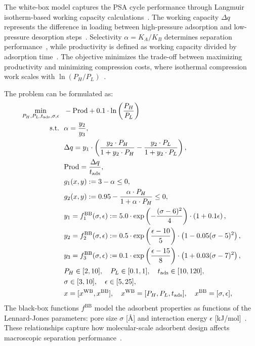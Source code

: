 \documentclass[12pt,a4paper]{article}%
\theoremstyle{plain}%
\theoremstyle{remark}%
\theoremstyle{definition}%
\def\WB{\mathrm{WB}}
\def\BB{\mathrm{BB}}
\begin{document}
\begin{appendices}
The white-box model captures the PSA cycle performance through Langmuir isotherm-based working capacity calculations~\cite{langmuir1918adsorption,wang2023adsorption}. The working capacity $\Delta q$ represents the difference in loading between high-pressure adsorption and low-pressure desorption steps~\cite{yang1987gas,ruthven1994psa}. Selectivity $\alpha = K_A/K_B$ determines separation performance~\cite{hasan2013cost}, while productivity is defined as working capacity divided by adsorption time~\cite{leperi2019surrogate}. The objective minimizes the trade-off between maximizing productivity and minimizing compression costs, where isothermal compression work scales with $\ln(P_H/P_L)$~\cite{smith2018thermodynamics}.

The problem can be formulated as:
\begin{align} \label{eq:PSA}
    \min_{P_H, P_L, t_{\text{ads}}, \sigma, \epsilon} &~~ -\text{Prod} + 0.1 \cdot \ln\left(\frac{P_H}{P_L}\right) \\\notag
    \text{s.t.} &~~ \alpha = \frac{y_2}{y_3}, \\\notag
    &~~ \Delta q = y_1 \cdot \left(\frac{y_2 \cdot P_H}{1 + y_2 \cdot P_H} - \frac{y_2 \cdot P_L}{1 + y_2 \cdot P_L}\right), \\\notag
    &~~ \text{Prod} = \frac{\Delta q}{t_{\text{ads}}}, \\\notag
    &~~ g_1(x, y) := 3 - \alpha \leq 0, \\\notag
    &~~ g_2(x, y) := 0.95 - \frac{\alpha \cdot P_H}{1 + \alpha \cdot P_H} \leq 0, \\\notag
    &~~ y_1 = f^\BB_1(\sigma, \epsilon) := 5.0 \cdot \exp\left(-\frac{(\sigma - 6)^2}{4}\right) \cdot \left(1 + 0.1\epsilon\right), \\\notag
    &~~ y_2 = f^\BB_2(\sigma, \epsilon) := 0.5 \cdot \exp\left(\frac{\epsilon - 10}{5}\right) \cdot \left(1 - 0.05(\sigma - 5)^2\right), \\\notag
    &~~ y_3 = f^\BB_3(\sigma, \epsilon) := 0.1 \cdot \exp\left(\frac{\epsilon - 15}{8}\right) \cdot \left(1 + 0.03(\sigma - 7)^2\right), \\\notag
    &~~ P_H \in [2, 10], \quad P_L \in [0.1, 1], \quad t_{\text{ads}} \in [10, 120], \\\notag
    &~~ \sigma \in [3, 10], \quad \epsilon \in [5, 25], \\\notag
    &~~ x = [x^{\WB}, x^{\BB}], \quad x^{\WB} = [P_H, P_L, t_{\text{ads}}], \quad x^{\BB} = [\sigma, \epsilon],
\end{align}
The black-box functions $f^\BB$ model the adsorbent properties as functions of the Lennard-Jones parameters: pore size $\sigma$ [\AA] and interaction energy $\epsilon$ [kJ/mol]~\cite{dubbeldam2019force,smit2008molecular}. These relationships capture how molecular-scale adsorbent design affects macroscopic separation performance~\cite{burns2020process}.


\end{appendices}
\end{document}
